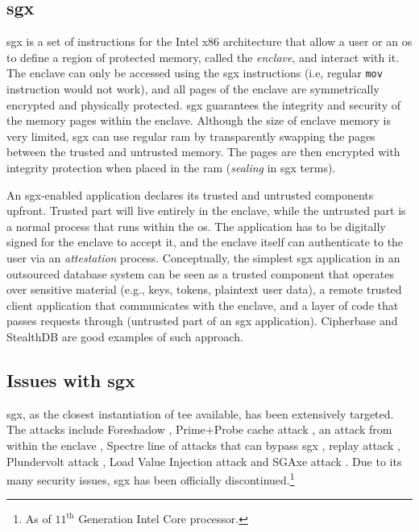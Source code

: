 		\subsection{\texorpdfstring{\acrlong{sgx}}{Software Guard Extensions}}

			\acrfull{sgx} is a set of instructions for the Intel x86 architecture that allow a user or an \acrlong{os} to define a region of protected memory, called the \emph{enclave}, and interact with it.
			The enclave can only be accessed using the \acrshort{sgx} instructions (i.e, regular \texttt{mov} instruction would not work), and all pages of the enclave are symmetrically encrypted and physically protected.
			\acrshort{sgx} guarantees the integrity and security of the memory pages within the enclave.
			Although the size of enclave memory is very limited, \acrshort{sgx} can use regular \acrshort{ram} by transparently swapping the pages between the trusted and untrusted memory.
			The pages are then encrypted with integrity protection when placed in the \acrshort{ram} (\emph{sealing} in \acrshort{sgx} terms).

			An \acrshort{sgx}-enabled application declares its trusted and untrusted components upfront.
			Trusted part will live entirely in the enclave, while the untrusted part is a normal process that runs within the \acrshort{os}.
			The application has to be digitally signed for the enclave to accept it, and the enclave itself can authenticate to the user via an \emph{attestation} process.
			Conceptually, the simplest \acrshort{sgx} application in an outsourced database system can be seen as a trusted component that operates over sensitive material (e.g., keys, tokens, plaintext user data), a remote trusted client application that communicates with the enclave, and a layer of code that passes requests through (untrusted part of an \acrshort{sgx} application).
			Cipherbase \cite{cipherbase-daas} and StealthDB \cite{stealth-db} are good examples of such approach.

		\subsection{Issues with \acrshort{sgx}}

			\acrshort{sgx}, as the closest instantiation of \acrshort{tee} available, has been extensively targeted.
			The attacks include Foreshadow \cite{foreshadow}, Prime+Probe cache attack \cite{prime-probe-sgx-attack}, an attack from within the enclave \cite{enclave-sgx-attack}, Spectre line of attacks that can bypass \acrshort{sgx} \cite{spectre-sgx-attack}, replay attack \cite{replay-sgx-attack}, Plundervolt attack \cite{plundervolt-sgx-attack}, Load Value Injection attack \cite{lvi-sgx-attack} and SGAxe attack \cite{sgaxe-sgx-attack}.
			Due to its many security issues, \acrshort{sgx} has been officially discontinued.\footnote{As of $11^\text{th}$ Generation Intel Core processor.}

